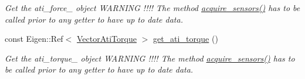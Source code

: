 \begin{DoxyCompactItemize}
\begin{DoxyCompactList}\small\item\em Get the ati\+\_\+force\+\_\+ object W\+A\+R\+N\+I\+NG !!!! The method \hyperlink{classblmc__robots_1_1Teststand_a4203e25148ab5b4ddfef3b46647213c6}{acquire\+\_\+sensors()} has to be called prior to any getter to have up to date data. \end{DoxyCompactList}\item 
const Eigen\+::\+Ref$<$ \hyperlink{classblmc__robots_1_1Teststand_a466977786f9b007854fa2eb2a97b0de9}{Vector\+Ati\+Torque} $>$ \hyperlink{classblmc__robots_1_1Teststand_a27ba45a099b4ff6852f5acd0226aa915}{get\+\_\+ati\+\_\+torque} ()
\begin{DoxyCompactList}\small\item\em Get the ati\+\_\+torque\+\_\+ object W\+A\+R\+N\+I\+NG !!!! The method \hyperlink{classblmc__robots_1_1Teststand_a4203e25148ab5b4ddfef3b46647213c6}{acquire\+\_\+sensors()} has to be called prior to any getter to have up to date data. \end{DoxyCompactList}\end{DoxyCompactItemize}
